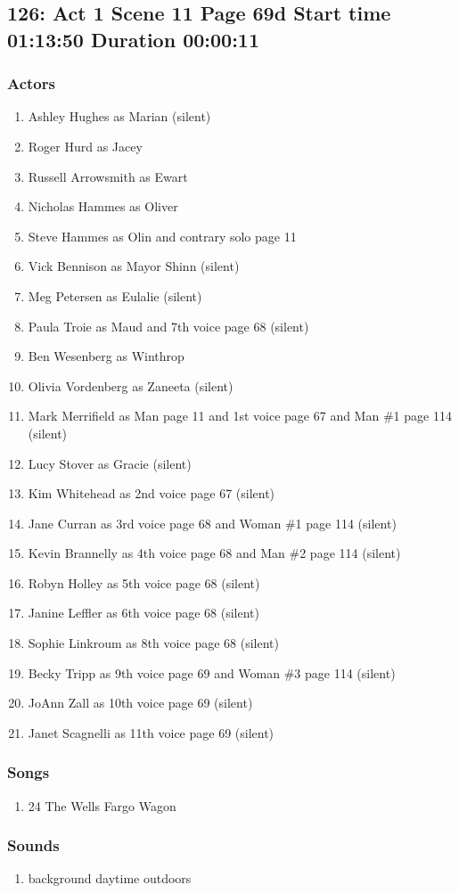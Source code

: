 \subsection{126: Act 1 Scene 11 Page 69d Start time 01:13:50 Duration 00:00:11}

\subsubsection{Actors}
\begin{enumerate}
\item Ashley Hughes as Marian (silent)
\item Roger Hurd as Jacey
\item Russell Arrowsmith as Ewart
\item Nicholas Hammes as Oliver
\item Steve Hammes as Olin and contrary solo page 11
\item Vick Bennison as Mayor Shinn (silent)
\item Meg Petersen as Eulalie (silent)
\item Paula Troie as Maud and 7th voice page 68 (silent)
\item Ben Wesenberg as Winthrop
\item Olivia Vordenberg as Zaneeta (silent)
\item Mark Merrifield as Man page 11 and 1st voice page 67 and Man \#1 page 114 (silent)
\item Lucy Stover as Gracie (silent)
\item Kim Whitehead as 2nd voice page 67 (silent)
\item Jane Curran as 3rd voice page 68 and Woman \#1 page 114 (silent)
\item Kevin Brannelly as 4th voice page 68 and Man \#2 page 114 (silent)
\item Robyn Holley as 5th voice page 68 (silent)
\item Janine Leffler as 6th voice page 68 (silent)
\item Sophie Linkroum as 8th voice page 68 (silent)
\item Becky Tripp as 9th voice page 69 and Woman \#3 page 114 (silent)
\item JoAnn Zall as 10th voice page 69 (silent)
\item Janet Scagnelli as 11th voice page 69 (silent)
\end{enumerate}

\subsubsection{Songs}
\begin{enumerate}
\item 24 The Wells Fargo Wagon
\end{enumerate}\subsubsection{Sounds}
\begin{enumerate}
\item background daytime outdoors
\end{enumerate}
